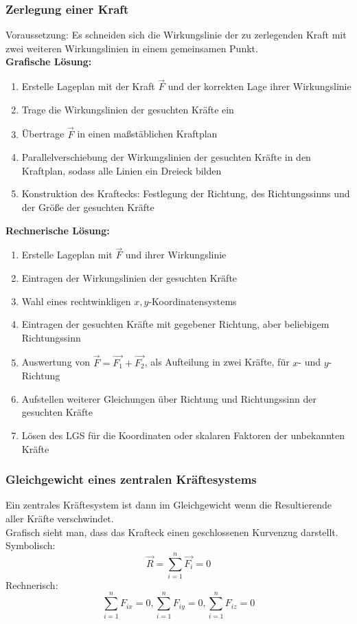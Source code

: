 \documentclass[a4paper,parskip=half*,DIV=7,fontsize=11pt]{scrartcl}
\begin{document}
\subsubsection{Zerlegung einer Kraft}
Voraussetzung: Es schneiden sich die Wirkungslinie der zu zerlegenden Kraft mit zwei weiteren Wirkungslinien in einem gemeinsamen Punkt.\\
\textbf{Grafische Lösung:}
\begin{enumerate}
	\item Erstelle Lageplan mit der Kraft $\overrightarrow{F}$ und der korrekten Lage ihrer Wirkungslinie
	\item Trage die Wirkungslinien der gesuchten Kräfte ein
	\item Übertrage $\overrightarrow{F}$ in einen maßstäblichen Kraftplan
	\item Parallelverschiebung der Wirkungslinien der gesuchten Kräfte in den Kraftplan, sodass alle Linien ein Dreieck bilden
	\item Konstruktion des Kraftecks: Festlegung der Richtung, des Richtungssinns und der Größe der gesuchten Kräfte
\end{enumerate}
\textbf{Rechnerische Lösung:}
\begin{enumerate}
	\item Erstelle Lageplan mit $\overrightarrow{F}$ und ihrer Wirkungslinie
	\item Eintragen der Wirkungslinien der gesuchten Kräfte
	\item Wahl eines rechtwinkligen $x,y$-Koordinatensystems
	\item Eintragen der gesuchten Kräfte mit gegebener Richtung, aber beliebigem Richtungssinn
	\item Auswertung von $\overrightarrow{F}=\overrightarrow{F_1}+\overrightarrow{F_2}$, als Aufteilung in zwei Kräfte, für $x$- und $y$-Richtung
	\item Aufstellen weiterer Gleichungen über Richtung und Richtungssinn der gesuchten Kräfte
	\item Lösen des LGS für die Koordinaten oder skalaren Faktoren der unbekannten Kräfte
\end{enumerate}

\subsubsection{Gleichgewicht eines zentralen Kräftesystems}
Ein zentrales Kräftesystem ist dann im Gleichgewicht wenn die Resultierende aller Kräfte verschwindet.\\
Grafisch sieht man, dass das Krafteck einen geschlossenen Kurvenzug darstellt.\\
Symbolisch: $$\overrightarrow{R}=\sum_{i=1}^n \overrightarrow{F_i}=0$$
Rechnerisch: $$\sum_{i=1}^n F_{ix}=0,\sum_{i=1}^n F_{iy}=0,\sum_{i=1}^n F_{iz}=0$$
\end{document}
